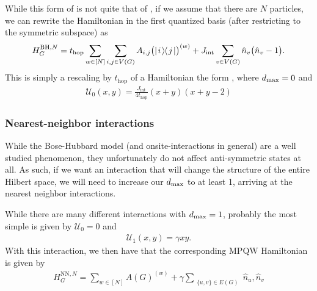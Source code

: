 \documentclass[../thesis-main/thesis-main]{subfiles}
\begin{document}
While this form of  is not quite that of , if we assume that there are $N$ particles, we can rewrite the Hamiltonian in the first quantized basis (after restricting to the symmetric subspace) as
\begin{align}
  H_G^{\text{BH},N} = t_{\text{hop}} \sum_{w\in [N]} \sum_{i,j\in V(G)} A_{i,j} \big( |\mspace{2mu} i \mspace{2mu} \rangle\mspace{-2mu}\langle\mspace{2mu} j \mspace{2mu} | \big)^{(w)} + J_{\text{int}}\sum_{v\in V(G)}\hat{n}_v\big( \hat{n}_v - 1\big).
\end{align}
This is simply a rescaling by $t_{\text{hop}}$ of a Hamiltonian the form , where $d_{\text{max}} = 0$ and 
\begin{align}
  \mathcal{U}_0(x,y) = \frac{J_{\text{int}}}{4t_{\text{hop}}} (x+y) (x+y-2)
\end{align}

\subsubsection{Nearest-neighbor interactions}

While the Bose-Hubbard model (and onsite-interactions in general) are a well studied phenomenon, they unfortunately do not affect anti-symmetric states at all.  As such, if we want an interaction that will change the structure of the entire Hilbert space, we will need to increase our $d_{\text{max}}$ to at least 1, arriving at the nearest neighbor interactions.  

While there are many different interactions with $d_{\text{max}} = 1$, probably the most simple is given by $\mathcal{U}_0 = 0$ and 
\begin{align}
  \mathcal{U}_1(x,y) = \gamma xy.
\end{align}
With this interaction, we then have that the corresponding MPQW Hamiltonian is given by
\begin{align}
  H_{G}^{\text{NN},N} = \sum_{w\in [N]} A(G)^{(w)} +  \gamma \sum_{\substack{ \{u,v\}\in E(G)}}\hat{n}_u,\hat{n}_v
\end{align}

%
%
%
\end{document}
